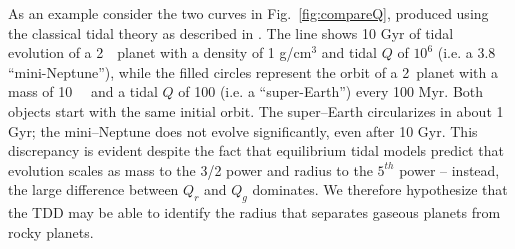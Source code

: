 As an example consider the two curves in Fig.~\ref{fig:compareQ}, produced using the classical tidal theory as described in \cite{Barnes13}.  The
line shows 10 Gyr of tidal evolution of a 2~\rearth~planet with a
density of 1 g/cm$^3$ and tidal $Q$ of $10^6$ (i.e. a 3.8~\mearth~
``mini-Neptune''), while the filled circles represent the orbit of a
2~\rearth planet with a mass of 10~\mearth~ and a tidal $Q$ of 100
(i.e. a ``super-Earth'') every 100 Myr.  Both objects start with the
same initial orbit.  The super--Earth circularizes in about 1 Gyr;
the mini--Neptune does not evolve significantly, even after 10 Gyr.
This discrepancy is evident despite the fact that equilibrium tidal
models predict that evolution scales as mass to the 3/2 power and
radius to the $5^{th}$ power -- instead, the large difference between
$Q_r$ and $Q_g$ dominates.  We therefore hypothesize that the TDD may
be able to identify the radius that separates gaseous planets from
rocky planets.

